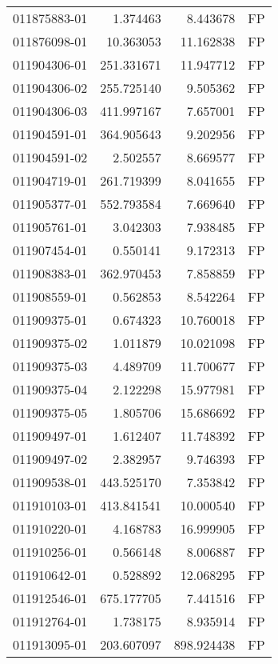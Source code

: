 \begin{tabular}{lrrl}
011875883-01 &    1.374463 &       8.443678 &   FP \\
011876098-01 &   10.363053 &      11.162838 &   FP \\
011904306-01 &  251.331671 &      11.947712 &   FP \\
011904306-02 &  255.725140 &       9.505362 &   FP \\
011904306-03 &  411.997167 &       7.657001 &   FP \\
011904591-01 &  364.905643 &       9.202956 &   FP \\
011904591-02 &    2.502557 &       8.669577 &   FP \\
011904719-01 &  261.719399 &       8.041655 &   FP \\
011905377-01 &  552.793584 &       7.669640 &   FP \\
011905761-01 &    3.042303 &       7.938485 &   FP \\
011907454-01 &    0.550141 &       9.172313 &   FP \\
011908383-01 &  362.970453 &       7.858859 &   FP \\
011908559-01 &    0.562853 &       8.542264 &   FP \\
011909375-01 &    0.674323 &      10.760018 &   FP \\
011909375-02 &    1.011879 &      10.021098 &   FP \\
011909375-03 &    4.489709 &      11.700677 &   FP \\
011909375-04 &    2.122298 &      15.977981 &   FP \\
011909375-05 &    1.805706 &      15.686692 &   FP \\
011909497-01 &    1.612407 &      11.748392 &   FP \\
011909497-02 &    2.382957 &       9.746393 &   FP \\
011909538-01 &  443.525170 &       7.353842 &   FP \\
011910103-01 &  413.841541 &      10.000540 &   FP \\
011910220-01 &    4.168783 &      16.999905 &   FP \\
011910256-01 &    0.566148 &       8.006887 &   FP \\
011910642-01 &    0.528892 &      12.068295 &   FP \\
011912546-01 &  675.177705 &       7.441516 &   FP \\
011912764-01 &    1.738175 &       8.935914 &   FP \\
011913095-01 &  203.607097 &     898.924438 &   FP \\

\end{tabular}

